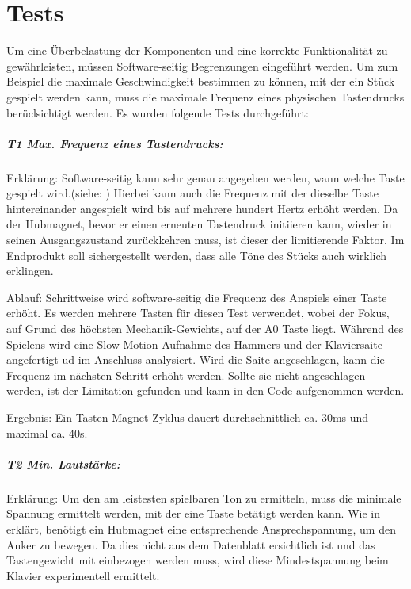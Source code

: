 \chapter{Tests}\label{tests}
\nocite{*}


Um eine Überbelastung der Komponenten und eine korrekte Funktionalität zu gewährleisten, müssen Software-seitig Begrenzungen eingeführt werden.
Um zum Beispiel die maximale Geschwindigkeit bestimmen zu können, mit der ein Stück gespielt werden kann, muss die maximale Frequenz eines physischen Tastendrucks berüclsichtigt werden.
Es wurden folgende Tests durchgeführt:

\paragraph{T1 Max. Frequenz eines Tastendrucks:}

Erklärung: Software-seitig kann sehr genau angegeben werden, wann welche Taste gespielt wird.(siehe: )
Hierbei kann auch die Frequenz mit der dieselbe Taste hintereinander angespielt wird bis auf mehrere hundert Hertz erhöht werden.
Da der Hubmagnet, bevor er einen erneuten Tastendruck initiieren kann, wieder in seinen Ausgangszustand zurückkehren muss, ist dieser der limitierende Faktor.
Im Endprodukt soll sichergestellt werden, dass alle Töne des Stücks auch wirklich erklingen.

Ablauf: Schrittweise wird software-seitig die Frequenz des Anspiels einer Taste erhöht.
Es werden mehrere Tasten für diesen Test verwendet, wobei der Fokus, auf Grund des höchsten Mechanik-Gewichts, auf der A0 Taste liegt.
Während des Spielens wird eine Slow-Motion-Aufnahme des Hammers und der Klaviersaite angefertigt ud im Anschluss analysiert.
Wird die Saite angeschlagen, kann die Frequenz im nächsten Schritt erhöht werden.
Sollte sie nicht angeschlagen werden, ist der Limitation gefunden und kann in den Code aufgenommen werden.

Ergebnis: Ein Tasten-Magnet-Zyklus dauert durchschnittlich ca. 30ms und maximal ca. 40s.

\paragraph{T2 Min. Lautstärke:}

Erklärung: Um den am leistesten spielbaren Ton zu ermitteln, muss die minimale Spannung ermittelt werden, mit der eine Taste betätigt werden kann.
Wie in  erklärt, benötigt ein Hubmagnet eine entsprechende Ansprechspannung, um den Anker zu bewegen.
Da dies nicht aus dem Datenblatt ersichtlich ist und das Tastengewicht mit einbezogen werden muss, wird diese Mindestspannung beim Klavier experimentell ermittelt.

